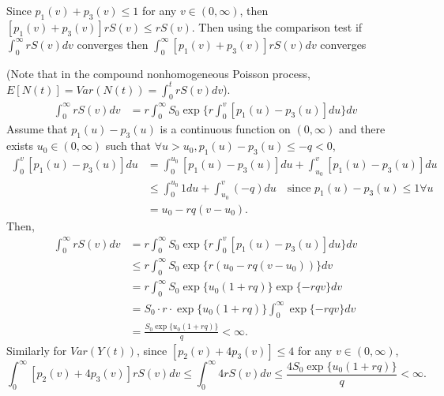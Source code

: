 \documentclass[12pt]{article}
\begin{document}
Since $p_1(v) + p_3(v) \leq 1$ for any $v \in (0, \infty)$, then $[p_1(v)+p_3(v)] r S(v) \leq rS(v)$. Then using the comparison test if $\int_0^\infty r S(v) dv$ converges then $\int_0^\infty [p_1(v)+p_3(v)] r S(v) dv$ converges 

(Note that in the compound nonhomogeneous Poisson process, $E[N(t)] = Var(N(t)) = \int_0^t r S(v) dv$).
\begin{equation}
\begin{split}
\int_0^\infty r S(v) dv & = r \int_0^\infty S_0 \exp \Big\{ r \int_0^v [p_1(u) - p_3(u)] du \Big\} dv
\end{split} 
\end{equation}
Assume that $p_1(u) - p_3(u)$ is a continuous function on $(0, \infty)$ and there exists $u_0 \in (0, \infty)$ such that $\forall u>u_0, p_1(u) - p_3(u) \leq -q < 0$,
\begin{equation}
\begin{split}
\int_0^v [p_1(u) - p_3(u)] du  &= \int_0^{u_0}  [p_1(u) - p_3(u)] du  + \int_{u_0}^{v}  [p_1(u) - p_3(u)] du  \\
& \leq  \int_0^{u_0}  1 du + \int_{u_0}^{v} (-q) du  \quad \text{since $p_1(u)-p_3(u) \leq 1 \forall u$} \\
& = u_0 - rq(v-u_0).
\end{split}
\end{equation}
Then,
\begin{equation}
\begin{split}
\int_0^\infty r S(v) dv & = r \int_0^\infty S_0 \exp \Big\{ r \int_0^v [p_1(u) - p_3(u)] du \Big\} dv \\
& \leq r \int_0^\infty S_0 \exp \{r ( u_0 - rq(v-u_0))\} dv \\
& = r \int_0^\infty S_0 \exp\{u_0 (1+rq)\} \exp\{-rqv\}dv \\
& = S_0 \cdot r \cdot \exp\{u_0 (1+rq)\} \int_0^\infty\exp\{-rqv\}dv \\
& = \frac{S_0 \exp\{u_0 (1+rq)\}}{q} < \infty.
\end{split}
\end{equation}
Similarly for $Var(Y(t))$, since $[p_2(v) + 4p_3(v)] \leq 4$ for any $v \in (0, \infty)$, 
$$ \int_0^\infty [p_2(v) + 4p_3(v)] r S(v) dv \leq \int_0^\infty 4 r S(v) dv  \leq \frac{4 S_0 \exp\{u_0 (1+rq)\}}{q} < \infty.$$
\end{document}
